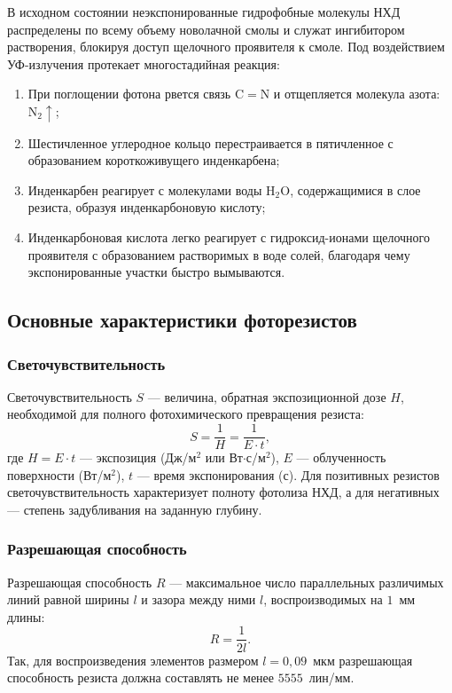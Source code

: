 \documentclass[12pt,a4paper]{article}
\theoremstyle{plain}
\theoremstyle{definition}
\theoremstyle{remark}
\numberwithin{equation}{section}
\begin{document}
В исходном состоянии неэкспонированные гидрофобные молекулы НХД распределены по всему объему 
новолачной смолы и служат ингибитором растворения, блокируя доступ щелочного проявителя к смоле. 
Под воздействием УФ-излучения протекает многостадийная реакция:
\begin{enumerate}
  \item При поглощении фотона рвется связь $\mathrm{C}=\mathrm{N}$ и отщепляется молекула азота:
  $\mathrm{N}_2\uparrow$;
  \item Шестичленное углеродное кольцо перестраивается в пятичленное с образованием короткоживущего 
  инденкарбена;
  \item Инденкарбен реагирует с молекулами воды $\mathrm{H}_2\mathrm{O}$, содержащимися в слое резиста, 
  образуя инденкарбоновую кислоту;
  \item Инденкарбоновая кислота легко реагирует с гидроксид-ионами щелочного проявителя с образованием 
  растворимых в воде солей, благодаря чему экспонированные участки быстро вымываются.
\end{enumerate}

\subsection{Основные характеристики фоторезистов}

\subsubsection{Светочувствительность}

Светочувствительность $S$ — величина, обратная экспозиционной дозе $H$, необходимой для 
полного фотохимического превращения резиста:
\begin{equation*}
  S = \frac{1}{H} = \frac{1}{E \cdot t},
\end{equation*}
где $H = E \cdot t$ — экспозиция (Дж/м$^2$ или Вт$\cdot$с/м$^2$), $E$ — облученность поверхности (Вт/м$^2$), 
$t$ — время экспонирования (с). Для позитивных резистов светочувствительность характеризует 
полноту фотолиза НХД, а для негативных — степень задубливания на заданную глубину.

\subsubsection{Разрешающая способность}

Разрешающая способность $R$ — максимальное число параллельных различимых линий равной 
ширины $l$ и зазора между ними $l$, воспроизводимых на $1$~мм длины:
\begin{equation*}
  R = \frac{1}{2l}.
\end{equation*}
Так, для воспроизведения элементов размером $l = 0{,}09$~мкм разрешающая способность резиста 
должна составлять не менее $5555$~лин/мм.
\end{document}
